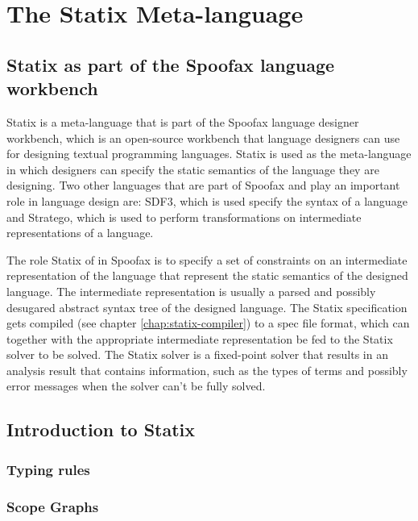 
\chapter{\label{chap:statix-meta-language}The Statix Meta-language}

\section{Statix as part of the Spoofax language workbench}

Statix is a meta-language that is part of the Spoofax language designer workbench, which is an open-source workbench that language designers can use for designing textual programming languages. Statix is used as the meta-language in which designers can specify the static semantics of the language they are designing. Two other languages that are part of Spoofax and play an important role in language design are: SDF3, which is used specify the syntax of a language and Stratego, which is used to perform transformations on intermediate representations of a language.

The role Statix of in Spoofax is to specify a set of constraints on an intermediate representation of the language  that represent the static semantics of the designed language. The intermediate representation is usually a parsed and possibly desugared abstract syntax tree of the designed language.
The Statix specification gets compiled (see chapter \ref{chap:statix-compiler}) to a spec file format, which can together with the appropriate intermediate representation be fed to the Statix solver to be solved. The Statix solver is a fixed-point solver that results in an analysis result that contains information, such as the types of terms and possibly error messages when the solver can't be fully solved.

\section{Introduction to Statix}

\subsection{Typing rules}

\subsection{Scope Graphs}
